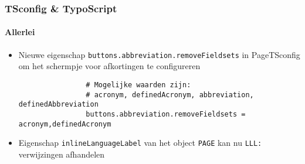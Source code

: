 \begin{frame}[fragile]
	\frametitle{TSconfig \& TypoScript}
	\framesubtitle{Allerlei}

	\begin{itemize}
		\item Nieuwe eigenschap \texttt{buttons.abbreviation.removeFieldsets} in PageTSconfig om het
			schermpje voor afkortingen te configureren

			\begin{lstlisting}
				# Mogelijke waarden zijn:
				# acronym, definedAcronym, abbreviation, definedAbbreviation
				buttons.abbreviation.removeFieldsets = acronym,definedAcronym
			\end{lstlisting}

		\item Eigenschap \texttt{inlineLanguageLabel} van het object \texttt{PAGE} kan nu \newline
			\texttt{LLL:} verwijzingen afhandelen

	\end{itemize}

\end{frame}

